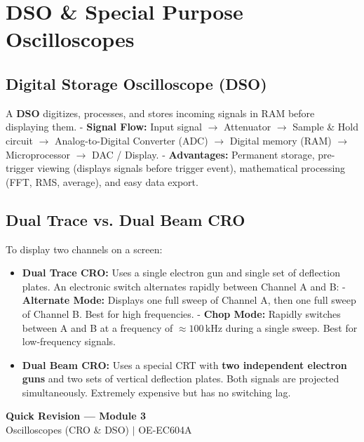 \documentclass[12pt,a4paper]{article}
\begin{document}
\section{DSO \& Special Purpose Oscilloscopes}

\subsection{Digital Storage Oscilloscope (DSO)}
A \textbf{DSO} digitizes, processes, and stores incoming signals in RAM before displaying them. 
- \textbf{Signal Flow:} Input signal $\to$ Attenuator $\to$ Sample \& Hold circuit $\to$ Analog-to-Digital Converter (ADC) $\to$ Digital memory (RAM) $\to$ Microprocessor $\to$ DAC / Display.
- \textbf{Advantages:} Permanent storage, pre-trigger viewing (displays signals before trigger event), mathematical processing (FFT, RMS, average), and easy data export.

\subsection{Dual Trace vs. Dual Beam CRO}
To display two channels on a screen:
\begin{itemize}[leftmargin=*, itemsep=3.5pt]
  \item \textbf{Dual Trace CRO:} Uses a single electron gun and single set of deflection plates. An electronic switch alternates rapidly between Channel A and B:
    - \textbf{Alternate Mode:} Displays one full sweep of Channel A, then one full sweep of Channel B. Best for high frequencies.
    - \textbf{Chop Mode:} Rapidly switches between A and B at a frequency of $\approx 100\,\text{kHz}$ during a single sweep. Best for low-frequency signals.
  \item \textbf{Dual Beam CRO:} Uses a special CRT with \textbf{two independent electron guns} and two sets of vertical deflection plates. Both signals are projected simultaneously. Extremely expensive but has no switching lag.
\end{itemize}

\newpage
\begin{center}
  {\large\bfseries\color{myred} Quick Revision --- Module 3}\\[3pt]
  {\small\color{mydark} Oscilloscopes (CRO \& DSO) $|$ OE-EC604A}
\end{center}
\noindent{\color{myred}\rule{\linewidth}{1.2pt}}
\vspace{4pt}
\end{document}
